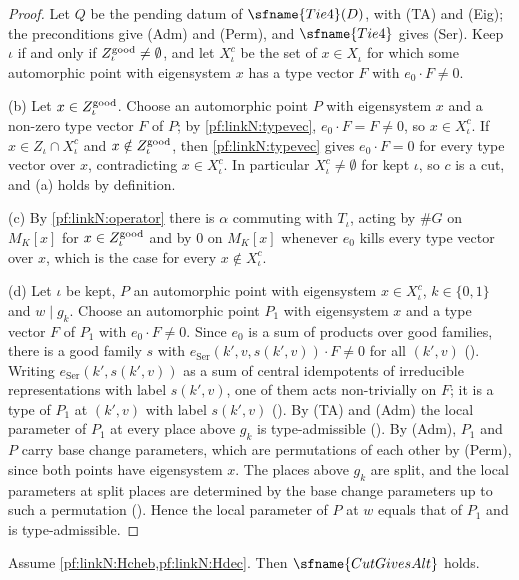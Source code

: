 \begin{proof}
Let $Q$ be the pending datum of $\sfname{Tie4}(D)$, with (TA) and (Eig); the preconditions give (Adm) and (Perm), and $\sfname{Tie4}$
gives (Ser). Keep $\iota$ if and only if $Z^{\mathrm{good}}_\iota\ne\emptyset$, and let $X^c_\iota$ be the set of $x\in X_\iota$ for which some
automorphic point with eigensystem $x$ has a type vector $F$ with $e_0\cdot F\ne0$.

(b) Let $x\in Z^{\mathrm{good}}_\iota$. Choose an automorphic point $P$ with eigensystem $x$ and a non-zero type vector $F$ of $P$; by
\cref{pf:linkN:typevec}, $e_0\cdot F=F\ne0$, so $x\in X^c_\iota$. If $x\in Z_\iota\cap X^c_\iota$ and $x\notin Z^{\mathrm{good}}_\iota$, then
\cref{pf:linkN:typevec} gives $e_0\cdot F=0$ for every type vector over $x$, contradicting $x\in X^c_\iota$. In particular $X^c_\iota\ne\emptyset$
for kept $\iota$, so $c$ is a cut, and (a) holds by definition.

(c) By \cref{pf:linkN:operator} there is $\alpha$ commuting with $T_\iota$, acting by $\#G$ on $M_K[x]$ for $x\in Z^{\mathrm{good}}_\iota$ and by
$0$ on $M_K[x]$ whenever $e_0$ kills every type vector over $x$, which is the case for every $x\notin X^c_\iota$.

(d) Let $\iota$ be kept, $P$ an automorphic point with eigensystem $x\in X^c_\iota$, $k\in\{0,1\}$ and $w\mid g_k$. Choose an automorphic
point $P_1$ with eigensystem $x$ and a type vector $F$ of $P_1$ with $e_0\cdot F\ne0$. Since $e_0$ is a sum of products over good
families, there is a good family $s$ with $e_{\mathrm{Ser}}(k',v,s(k',v))\cdot F\ne0$ for all $(k',v)$
(). Writing $e_{\mathrm{Ser}}(k',s(k',v))$ as a sum of central idempotents of irreducible
representations with label $s(k',v)$, one of them acts non-trivially on $F$; it is a type of $P_1$ at $(k',v)$ with label $s(k',v)$
(). By (TA) and (Adm) the local parameter of $P_1$ at every place above $g_k$ is
type-admissible (). By (Adm), $P_1$ and $P$ carry base change parameters, which are
permutations of each other by (Perm), since both points have eigensystem $x$. The places above $g_k$ are split, and the local
parameters at split places are determined by the base change parameters up to such a permutation
(). Hence the local parameter of $P$ at $w$ equals that of $P_1$ and is
type-admissible.
\end{proof}

\begin{theorem}\label{pf:linkN:goodcutfacts}
Assume \cref{pf:linkN:Hcheb,pf:linkN:Hdec}. Then $\sfname{CutGivesAlt}$ holds.
\end{theorem}


